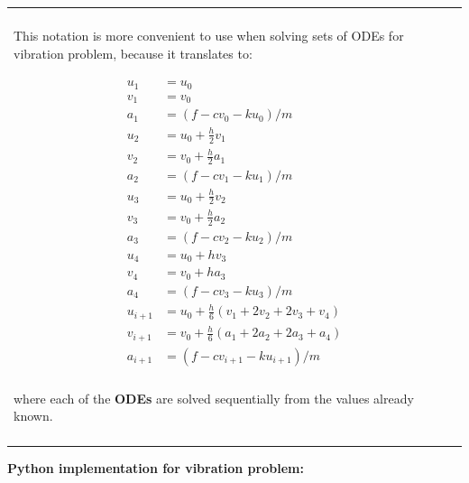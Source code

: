 \documentclass[10pt,b5paper,titlepage]{book}
\newenvironment{bbox}[1][0.96]
{
    \begin{center}
        \begin{tabular}{|p{#1\textwidth}|}
            \hline\\
}
{
            \\\\\hline
        \end{tabular}
    \end{center}
}
\newenvironment{eqarray}
{
    \begin{eqnarray}
        \begin{aligned}
}
{
        \end{aligned}
    \end{eqnarray}
}
\begin{document}
\begin{bbox}[0.96]
This notation is more convenient to use when solving sets of ODEs for vibration
problem, because it translates to:

\begin{eqarray}
    u_1 &= u_0\\
    v_1 &= v_0\\
    a_1 &= (f - c v_0 - k u_0) / m\\
    u_2 &= u_0 + \frac{h}{2} v_1\\
    v_2 &= v_0 + \frac{h}{2} a_1\\
    a_2 &= (f - c v_1 - k u_1) / m\\
    u_3 &= u_0 + \frac{h}{2} v_2\\
    v_3 &= v_0 + \frac{h}{2} a_2\\
    a_3 &= (f - c v_2 - k u_2) / m\\
    u_4 &= u_0 + h v_3\\
    v_4 &= v_0 + h a_3\\
    a_4 &= (f - c v_3 - k u_3) / m\\
    u_{i+1} &= u_0 + \frac{h}{6} \left( v_1 + 2 v_2 + 2 v_3 + v_4 \right) \\
    v_{i+1} &= v_0 + \frac{h}{6} \left( a_1 + 2 a_2 + 2 a_3 + a_4 \right) \\
    a_{i+1} &= (f - c v_{i+1} - k u_{i+1}) / m\\
\end{eqarray}

where each of the \textbf{ODEs} are solved sequentially from the values
already known.

\end{bbox}

\newpage
\textbf{Python implementation for vibration problem:}
\end{document}
